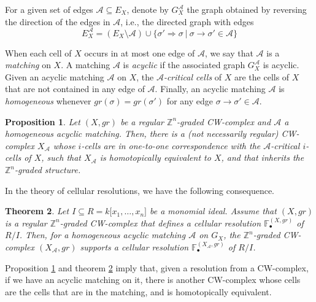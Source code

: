 \documentclass[paper=a4, fontsize=11pt]{scrartcl} %
\theoremstyle{plain}
\newtheorem{thm}{Theorem}[section]
\newtheorem{prop}[thm]{Proposition}
\theoremstyle{definition}
\begin{document}
For a given set of edges $\mathcal{A} \subseteq E_X$, denote by $G_{X}^{\mathcal{A}}$ the graph obtained by reversing the direction of the edges in $\mathcal{A}$, i.e., the directed graph with edges $$E_{X}^{\mathcal{A}} = (E_{X} \setminus \mathcal{A}) \cup \lbrace \sigma' \Longrightarrow \sigma  \ \vert \ \sigma \longrightarrow \sigma ' \in \mathcal{A}\rbrace$$

When each cell of $X$ occurs in at most one edge of $\mathcal{A}$, we say that $\mathcal{A}$ is a \textit{matching} on $X$. A matching $\mathcal{A}$ is \textit{acyclic} if the associated graph $G_{X}^{\mathcal{A}}$ is acyclic. Given an acyclic matching $\mathcal{A}$ on $X$, the $\mathcal{A}$\textit{-critical cells} of $X$ are the cells of $X$ that are not contained in any edge of $\mathcal{A}$. Finally, an acyclic matching $\mathcal{A}$ is \textit{homogeneous} whenever $gr(\sigma) = gr(\sigma ')$ for any edge $\sigma \longrightarrow \sigma ' \in \mathcal{A}$.

\begin{prop} \cite[Proposition 1.2]{BaWe02} \label{prop:matching}
Let $(X,gr)$ be a regular $\mathbb{Z}^n$-graded CW-complex and $\mathcal{A}$ a homogeneous acyclic matching. Then, there is a (not necessarily regular) CW-complex $X_{\mathcal{A}}$ whose $i$-cells are in one-to-one correspondence with the $\mathcal{A}$-critical $i$-cells of $X$, such that $X_{\mathcal{A}}$ is homotopically equivalent to $X$, and that inherits the $\mathbb{Z}^n$-graded structure.
\end{prop}

In the theory of cellular resolutions, we have the following consequence.

\begin{thm} \cite[Theorem 1.3]{BaWe02} \label{thm:matching}
Let $I \subseteq R = k  \lbrack x_1, \dots, x_n \rbrack$ be a monomial ideal. Assume that $(X,gr)$ is a regular $\mathbb{Z}^n$-graded CW-complex that defines a cellular resolution $\mathbb{F}_{\bullet}^{(X,gr)}$ of $R/I$. Then, for a homogeneous acyclic matching $\mathcal{A}$ on $G_X$, the $\mathbb{Z}^n$-graded CW-complex $(X_{\mathcal{A}},gr)$ supports a cellular resolution $\mathbb{F}_{\bullet}^{(X_{\mathcal{A}},gr)}$ of $R/I$.
\end{thm}

Proposition \ref{prop:matching} and theorem \ref{thm:matching} imply that, given a resolution from a CW-complex, if we have an acyclic matching on it, there is another CW-complex whose cells are the cells that are in the matching, and is homotopically equivalent.
\end{document}
